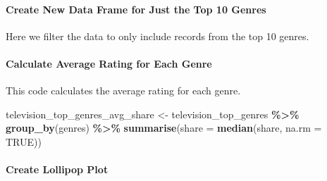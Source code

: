 \documentclass[
]{book}
\newenvironment{Shaded}{\begin{snugshade}}{\end{snugshade}}
\newcommand{\AttributeTok}[1]{\textcolor[rgb]{0.13,0.29,0.53}{#1}}
\newcommand{\ConstantTok}[1]{\textcolor[rgb]{0.56,0.35,0.01}{#1}}
\newcommand{\FunctionTok}[1]{\textcolor[rgb]{0.13,0.29,0.53}{\textbf{#1}}}
\newcommand{\NormalTok}[1]{#1}
\newcommand{\OtherTok}[1]{\textcolor[rgb]{0.56,0.35,0.01}{#1}}
\newcommand{\SpecialCharTok}[1]{\textcolor[rgb]{0.81,0.36,0.00}{\textbf{#1}}}
\begin{document}
\hypertarget{create-new-data-frame-for-just-the-top-10-genres}{%
\paragraph*{Create New Data Frame for Just the Top 10 Genres}\label{create-new-data-frame-for-just-the-top-10-genres}}

Here we filter the data to only include records from the top 10 genres.

\begin{Shaded}
\end{Shaded}

\hypertarget{calculate-average-rating-for-each-genre}{%
\paragraph*{Calculate Average Rating for Each Genre}\label{calculate-average-rating-for-each-genre}}

This code calculates the average rating for each genre.

\begin{Shaded}
\begin{Highlighting}[]
\NormalTok{television\_top\_genres\_avg\_share }\OtherTok{\textless{}{-}}\NormalTok{ television\_top\_genres }\SpecialCharTok{\%\textgreater{}\%}
  \FunctionTok{group\_by}\NormalTok{(genres) }\SpecialCharTok{\%\textgreater{}\%}
  \FunctionTok{summarise}\NormalTok{(}\AttributeTok{share =} \FunctionTok{median}\NormalTok{(share, }\AttributeTok{na.rm =} \ConstantTok{TRUE}\NormalTok{))}
\end{Highlighting}
\end{Shaded}

\hypertarget{create-lollipop-plot}{%
\paragraph*{Create Lollipop Plot}\label{create-lollipop-plot}}
\end{document}
